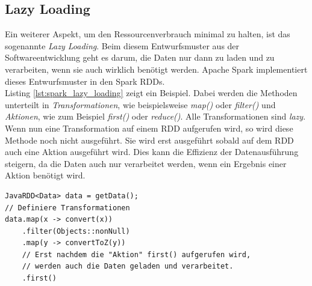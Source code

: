 \subsection*{Lazy Loading}
Ein weiterer Aspekt, um den Ressourcenverbrauch minimal zu halten, ist das sogenannte \textit{Lazy Loading}. Beim diesem Entwurfsmuster aus der Softwareentwicklung geht es darum, die Daten nur dann zu laden und zu verarbeiten, wenn sie auch wirklich benötigt werden. Apache Spark implementiert dieses Entwurfsmuster in den Spark RDDs.\cite{spark_rdd}\\
Listing \ref{lst:spark_lazy_loading} zeigt ein Beispiel. Dabei werden die Methoden unterteilt in \textit{Transformationen}, wie beispielsweise \textit{map()} oder \textit{filter()} und \textit{Aktionen}, wie zum Beispiel \textit{first()} oder \textit{reduce()}. Alle Transformationen sind \textit{lazy}. Wenn nun eine Transformation auf einem RDD aufgerufen wird, so wird diese Methode noch nicht ausgeführt. Sie wird erst ausgeführt sobald auf dem RDD auch eine Aktion ausgeführt wird. Dies kann die Effizienz der Datenausführung steigern, da die Daten auch nur verarbeitet werden, wenn ein Ergebnis einer Aktion benötigt wird.

\begin{lstlisting}[label={lst:spark_lazy_loading},caption= Lazy Loading bei Apache Spark ,captionpos=b,frame=single,style=customjava]
JavaRDD<Data> data = getData();
// Definiere Transformationen
data.map(x -> convert(x))
	.filter(Objects::nonNull)
	.map(y -> convertToZ(y))
	// Erst nachdem die "Aktion" first() aufgerufen wird,
	// werden auch die Daten geladen und verarbeitet.
	.first()
\end{lstlisting}

